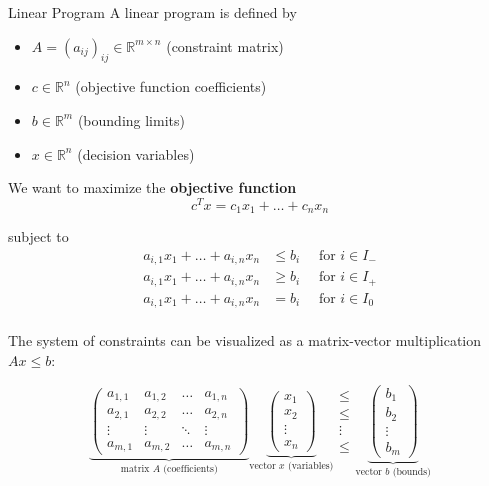 \documentclass[a4paper, 11pt]{report}
\begin{document}
\begin{defframe}{Linear Program}{}
    A linear program is defined by
\begin{itemize}
    \item $A = (a_{ij})_{ij} \in \mathbb{R}^{m \times n}$ (constraint matrix)
    \item $c \in \mathbb{R}^{n}$ (objective function coefficients)
    \item $b \in \mathbb{R}^{m}$ (bounding limits)
    \item $x \in \mathbb{R}^{n}$ (decision variables)
\end{itemize}

We want to maximize the \textbf{objective function}
$$c^T x = c_{1} x_{1} + \dots + c_{n}x_{n}$$

subject to
\begin{align*}
    a_{i,1}x_{1} + \dots + a_{i,n} x_{n} &\leq b_{i} \quad \text{ for } i \in I_{-} \\
    a_{i,1}x_{1} + \dots + a_{i,n} x_{n} &\geq b_{i} \quad \text{ for } i \in I_{+}  \\
    a_{i,1}x_{1} + \dots + a_{i,n} x_{n} &= b_{i} \quad \text{ for } i \in I_{0} \\
\end{align*}

The system of constraints can be visualized as a matrix-vector multiplication $Ax \le b$:

$$
\underbrace{
\begin{pmatrix}
    a_{1,1} & a_{1,2} & \dots & a_{1,n} \\
    a_{2,1} & a_{2,2} & \dots & a_{2,n} \\
    \vdots  & \vdots  & \ddots & \vdots \\
    a_{m,1} & a_{m,2} & \dots & a_{m,n}
\end{pmatrix}
}_{\text{matrix } A \text{ (coefficients)}}
\underbrace{
\begin{pmatrix}
    x_1 \\ 
    x_2 \\ 
    \vdots \\ 
    x_n
\end{pmatrix}
}_{\text{vector } x \text{ (variables)}}
\begin{matrix}
    \leq \\ 
    \leq \\ 
    \vdots \\ 
    \leq
\end{matrix}
\underbrace{
\begin{pmatrix}
    b_1 \\ 
    b_2 \\ 
    \vdots \\ 
    b_m
\end{pmatrix}
}_{\text{vector } b \text{ (bounds)}}
$$


\end{defframe}
\end{document}
